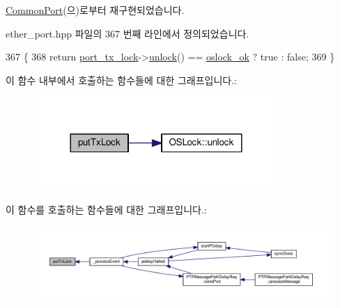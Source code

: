 \hyperlink{class_common_port_abd9f9f0cb1265dc44a7e4846b7a1dc32}{Common\+Port}(으)로부터 재구현되었습니다.



ether\+\_\+port.\+hpp 파일의 367 번째 라인에서 정의되었습니다.


\begin{DoxyCode}
367                      \{
368         \textcolor{keywordflow}{return} \hyperlink{class_ether_port_aac3f11c7b8748ed8a3d6d1b099d15a7a}{port\_tx\_lock}->\hyperlink{class_o_s_lock_a5b965df44250112cac3cf967dc998bec}{unlock}() == \hyperlink{avbts__oslock_8hpp_a6ade377184a937ebffbe2a94b7369a64a6bbac1b2760c150f568c6beaa33deea0}{oslock\_ok} ? \textcolor{keyword}{true} : \textcolor{keyword}{false};
369     \}
\end{DoxyCode}


이 함수 내부에서 호출하는 함수들에 대한 그래프입니다.\+:
\nopagebreak
\begin{figure}[H]
\begin{center}
\leavevmode
\includegraphics[width=264pt]{class_ether_port_a43b92f952fdff70f6e8b5b8f4302c7d9_cgraph}
\end{center}
\end{figure}




이 함수를 호출하는 함수들에 대한 그래프입니다.\+:
\nopagebreak
\begin{figure}[H]
\begin{center}
\leavevmode
\includegraphics[width=350pt]{class_ether_port_a43b92f952fdff70f6e8b5b8f4302c7d9_icgraph}
\end{center}
\end{figure}


